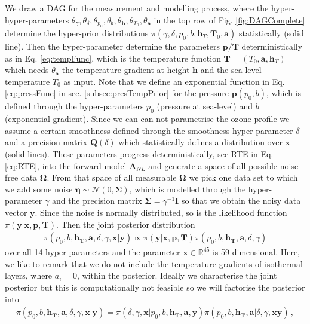We draw a DAG for the measurement and modelling process, where the hyper-hyper-parameters $\theta_{\gamma}, \theta_{\delta},\theta_{p_0},\theta_{b},\theta_{\bm{h}},\theta_{T_0},\theta_{\bm{a}}$ in the top row of Fig. \ref{fig:DAGComplete} determine the hyper-prior distributions $\pi(\gamma, \delta, p_0, b, \bm{h}_T, \bm{T}_0, \bm{a})$ statistically (solid line).
Then the hyper-parameter determine the parameters $\bm{p}/\bm{T}$ deterministically as in Eq. \ref{eq:tempFunc}, which is the temperature function $\bm{T} = (T_0,\bm{a}, \bm{h}_T)$ which needs $\theta_{\bm{a}}$ the temperature gradient at height $\bm{h}$ and the sea-level temperature $T_0$ as input.
Note that we define an exponential function in Eq. \ref{eq:pressFunc} in sec. \ref{subsec:presTempPrior} for the pressure $\bm{p}(p_0,b)$, which is defined through the hyper-parameters $p_0$ (pressure at sea-level) and $b$ (exponential gradient).
Since we can can not parametrise the ozone profile we assume a certain smoothness defined through the smoothness hyper-parameter $\delta$ and a precision matrix $\bm{Q}(\delta)$ which statistically defines a distribution over $\bm{x}$ (solid lines).
These parameters progress deterministically, see RTE in Eq. \ref{eq:RTE}, into the forward model $\bm{A}_{NL}$ and generate a space of all possible noise free data $\bm{\Omega}$.
From that space of all measurable $\bm{\Omega}$ we pick one data set to which we add some noise $\bm{\eta} \sim \mathcal{N}(0, \bm{\Sigma})$, which is modelled through the hyper-parameter $\gamma$ and the precision matrix $\bm{\Sigma} = \gamma^{-1} \bm{I}$ so that we obtain the noisy data vector $\bm{y}$.
Since the noise is normally distributed, so is the likelihood function $\pi(\bm{y} | \bm{x}, \bm{p}, \bm{T})$.
Then the joint posterior distribution
\begin{align}
	\pi(p_0,b,\bm{h_T},\bm{a},\delta, \gamma, \bm{x}| \bm{y}) \propto \pi(\bm{y} | \bm{x}, \bm{p}, \bm{T}) \pi(p_0,b,\bm{h_T},\bm{a},\delta, \gamma) 
\end{align}
over all 14 hyper-parameters and the parameter $\bm{x} \in \mathbb{R}^{45}$ is 59 dimensional.
Here, we like to remark that we do not include the temperature gradients of isothermal layers, where $a_i=0$, within the posterior.
Ideally we characterise the joint posterior but this is computationally not feasible so we will factorise the posterior into
\begin{align}
	\pi(p_0,b,\bm{h_T},\bm{a},\delta, \gamma, \bm{x}| \bm{y}) = \pi(\delta, \gamma, \bm{x}| p_0,b,\bm{h_T},\bm{a},\bm{y}) \pi(p_0,b,\bm{h_T},\bm{a}|\delta, \gamma, \bm{x} \bm{y}) \, , 
\end{align}
